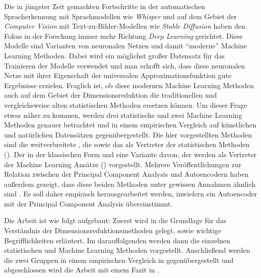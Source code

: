 Die in jüngster Zeit gemachten Fortschritte in der automatischen Spracherkennung mit Sprachmodellen
wie \textit{Whisper} \parencite{Radford.2022} und auf dem Gebiet der \textit{Computer Vision} mit Text-zu-Bilder-Modellen
wie \textit{Stable Diffusion} \parencite{Rombach.2021} haben den Fokus in der Forschung immer mehr Richtung \textit{Deep Learning}
gerichtet. Diese Modelle sind Varianten von neuronalen Netzen und damit \enquote{moderne} Machine
Learning Methoden. Dabei wird ein möglichst großer Datensatz für das Trainieren der Modelle
verwendet und man erhofft sich, dass diese neuronalen Netze mit ihrer Eigenschaft der universalen
Approximationsfunktion \parencites[194 -- 197]{Goodfellow.2016}{Hornik.1989} gute Ergebnisse erzielen. Fraglich ist, ob diese
modernen Machine Learning Methoden auch auf dem Gebiet der Dimensionsreduktion die traditionellen
und vergleichsweise alten statistischen Methoden ersetzen können. Um dieser Frage etwas näher zu
kommen, werden drei statistische und zwei Machine Learning Methoden genauer betrachtet und in einem
empirischen Vergleich auf künstlichen und natürlichen Datensätzen gegenübergestellt. Die hier
vorgestellten Methoden sind die weitverbreitete , die
 sowie das  als
Vertreter der statistischen Methoden (). Der
 in der klassischen Form und eine Variante davon, der  werden als Vertreter der Machine Learning Ansätze
() vorgestellt. Mehrere Veröffentlichungen zur Relation
zwischen der Principal Component Analysis und Autoencodern haben außerdem gezeigt, dass diese
beiden Methoden unter gewissen Annahmen ähnlich sind \parencites{Baldi.1989}{Bourlard.1988}{Plaut.2018}. Es soll daher empirisch herausgearbeitet werden,
inwiefern ein Autoencoder mit der Principal Component Analysis übereinstimmt.

Die Arbeit ist wie folgt aufgebaut: Zuerst wird in  die Grundlage
für das Verständnis der Dimensionsreduktionsmethoden gelegt, sowie wichtige Begrifflichkeiten
erläutert. Im darauffolgenden  werden dann die einzelnen
statistischen und Machine Learning Methoden vorgestellt. Anschließend werden die zwei Gruppen in
einem empirischen Vergleich in  gegenübergestellt und abgeschlossen wird die
Arbeit mit einem Fazit in .